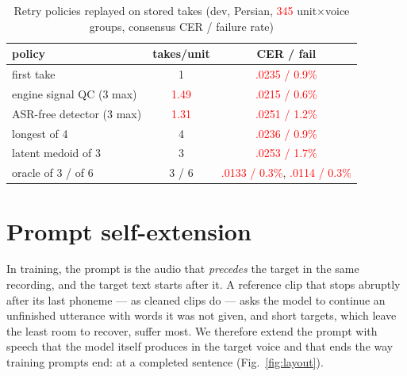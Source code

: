 \documentclass[conference]{IEEEtran}
\newcommand{\RES}[1]{\textcolor{red}{#1}}
\begin{document}
\begin{table}[t]
\caption{Retry policies replayed on stored takes (dev, Persian, \RES{345} unit$\times$voice groups,
consensus CER / failure rate)}\label{tab:sel}
\centering
\begin{tabular}{lcc}
\toprule
policy & takes/unit & CER / fail \\
\midrule
first take & 1 & \RES{.0235 / 0.9\%} \\
engine signal QC (3 max) & \RES{1.49} & \RES{.0215 / 0.6\%} \\
ASR-free detector (3 max) & \RES{1.31} & \RES{.0251 / 1.2\%} \\
longest of 4 & 4 & \RES{.0236 / 0.9\%} \\
latent medoid of 3 & 3 & \RES{.0253 / 1.7\%} \\
oracle of 3 / of 6 & 3 / 6 & \RES{.0133 / 0.3\%}, \RES{.0114 / 0.3\%} \\
\bottomrule
\end{tabular}
\end{table}

\section{Prompt self-extension}\label{sec:b}
In training, the prompt is the audio that \emph{precedes} the target in the same recording, and the target
text starts after it. A reference clip that stops abruptly after its last phoneme --- as cleaned clips do ---
asks the model to continue an unfinished utterance with words it was not given, and short targets, which
leave the least room to recover, suffer most. We therefore extend the prompt with speech that the model
itself produces in the target voice and that ends the way training prompts end: at a completed sentence
(Fig.~\ref{fig:layout}).
\end{document}
